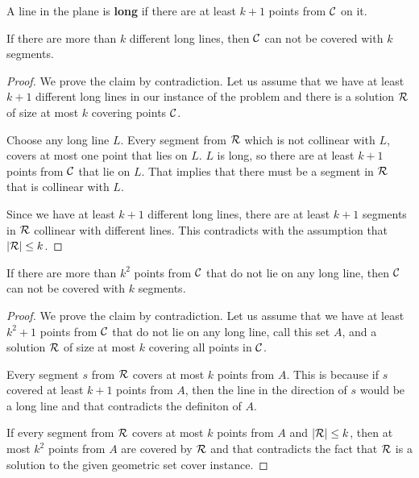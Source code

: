 \begin{defi}
A line in the plane is \textbf{long}
if there are at least $k+1$ points from $\mathcal{C}$ on it.
\end{defi}

\begin{claim}
\label{few_long_lines}
If there are more than $k$ different long lines, then 
$\mathcal{C}$ can not be covered with $k$ segments.
\end{claim}

\begin{proof}
We prove the claim by contradiction.
Let us assume that we have at least $k+1$ different
long lines in our instance of the problem
and there is a solution $\mathcal{R}$ of size at most $k$
covering points $\mathcal{C}$.

Choose any long line $L$.
Every segment from $\mathcal{R}$ which is not collinear with $L$,
covers at most one point that lies on $L$.
$L$ is long, so there are at least $k+1$ points from $\mathcal{C}$ that lie on $L$.
That implies that there must be a segment in $\mathcal{R}$ that is
collinear with $L$.

Since we have at least $k+1$ different long lines,
there are at least $k+1$
segments in $\mathcal{R}$ collinear with different lines.
This contradicts with the assumption that $|\mathcal{R}| \le k$.
\end{proof}

\begin{claim}
\label{few_points}
If there are more than $k^2$ points from $\mathcal{C}$
that do not lie on any long line,
then $\mathcal{C}$ can not be covered with $k$ segments.
\end{claim}

\begin{proof}
We prove the claim by contradiction.
Let us assume that we have at least $k^2+1$ points
from $\mathcal{C}$ that do not lie on any long line, call this set $A$,
and a solution $\mathcal{R}$ of size at most $k$
covering all points in $\mathcal{C}$.

Every segment $s$ from $\mathcal{R}$ covers at most $k$
points from $A$.
This is because if $s$ covered at least $k+1$ points from $A$,
then the line in the direction of $s$ would be a long line
and that contradicts the definiton of $A$.

If every segment from $\mathcal{R}$ covers at most $k$ points from $A$
and $|\mathcal{R}| \le k$, then at most $k^2$ points from $A$ are covered by $\mathcal{R}$
and that contradicts the fact that $\mathcal{R}$ is a solution to the given
geometric set cover instance.
\end{proof}

